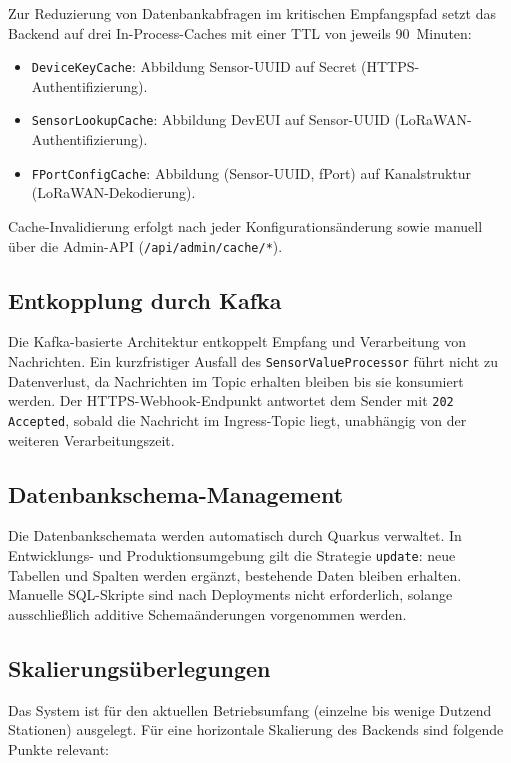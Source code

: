 Zur Reduzierung von Datenbankabfragen im kritischen Empfangspfad setzt das Backend
auf drei In-Process-Caches mit einer TTL von jeweils 90~Minuten:

\begin{itemize}
  \item \texttt{DeviceKeyCache}: Abbildung Sensor-UUID auf Secret (HTTPS-Authentifizierung).
  \item \texttt{SensorLookupCache}: Abbildung DevEUI auf Sensor-UUID (LoRaWAN-Authentifizierung).
  \item \texttt{FPortConfigCache}: Abbildung (Sensor-UUID, fPort) auf Kanalstruktur
        (LoRaWAN-Dekodierung).
\end{itemize}

Cache-Invalidierung erfolgt nach jeder Konfigurationsänderung sowie manuell über die
Admin-API (\texttt{/api/admin/cache/*}).

\subsection*{Entkopplung durch Kafka}

Die Kafka-basierte Architektur entkoppelt Empfang und Verarbeitung von Nachrichten.
Ein kurzfristiger Ausfall des \texttt{SensorValueProcessor} führt nicht zu Datenverlust,
da Nachrichten im Topic erhalten bleiben bis sie konsumiert werden.
Der HTTPS-Webhook-Endpunkt antwortet dem Sender mit \texttt{202 Accepted}, sobald die
Nachricht im Ingress-Topic liegt, unabhängig von der weiteren Verarbeitungszeit.

\subsection*{Datenbankschema-Management}

Die Datenbankschemata werden automatisch durch Quarkus verwaltet.
In Entwicklungs- und Produktionsumgebung gilt die Strategie \texttt{update}:
neue Tabellen und Spalten werden ergänzt, bestehende Daten bleiben erhalten.
Manuelle SQL-Skripte sind nach Deployments nicht erforderlich, solange ausschließlich
additive Schemaänderungen vorgenommen werden.

\subsection*{Skalierungsüberlegungen}

Das System ist für den aktuellen Betriebsumfang (einzelne bis wenige Dutzend Stationen)
ausgelegt. Für eine horizontale Skalierung des Backends sind folgende Punkte relevant:

